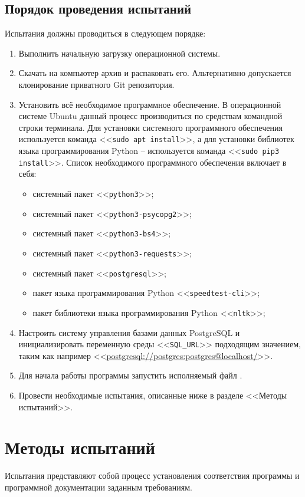 \documentclass[a4paper,12pt]{article}
\begin{document}
  \subsection{Порядок проведения испытаний}
  Испытания должны проводиться в следующем порядке:
  \begin{enumerate}
    \item Выполнить начальную загрузку операционной системы.
    \item Скачать на компьютер архив \CRTzip{} и распаковать его. Альтернативно допускается клонирование приватного Git репозитория.
    \item Установить всё необходимое программное обеспечение.
      В операционной системе Ubuntu данный процесс производиться по средствам командной строки терминала.
      Для установки системного программного обеспечения используется команда <<\texttt{sudo apt install}>>,
      а для установки библиотек языка программирования Python -- используется команда <<\texttt{sudo pip3 install}>>.
      Список необходимого программного обеспечения включает в себя:
      \begin{itemize}
        \item системный пакет <<\texttt{python3}>>;
        \item системный пакет <<\texttt{python3-psycopg2}>>;
        \item системный пакет <<\texttt{python3-bs4}>>;
        \item системный пакет <<\texttt{python3-requests}>>;
        \item системный пакет <<\texttt{postgresql}>>;
        \item пакет языка программирования Python <<\texttt{speedtest-cli}>>;
        \item пакет библиотеки языка программирования Python <<\texttt{nltk}>>;
      \end{itemize}
    \item Настроить систему управления базами данных PostgreSQL и инициализировать переменную среды <<\texttt{SQL\_URL}>> подходящим значением, таким как например <<\url{postgresql://postgres:postgres@localhost/}>>.
    \item Для начала работы программы запустить исполняемый файл \CRTexe{}.
    \item Провести необходимые испытания, описанные ниже в разделе <<Методы испытаний>>.
  \end{enumerate}

  \newpage
  \section{Методы испытаний}
  Испытания представляют собой процесс установления соответствия программы и программной документации заданным требованиям.
\end{document}

